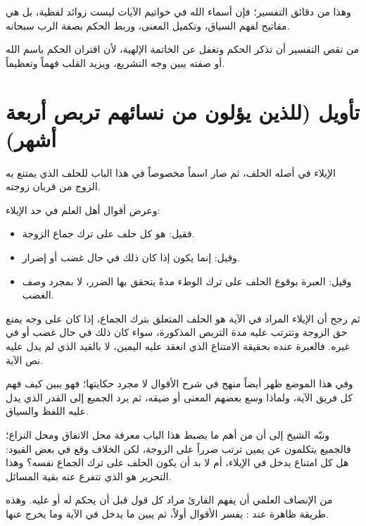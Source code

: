 وهذا من دقائق التفسير؛ فإن أسماء الله في خواتيم الآيات ليست زوائد لفظية، بل هي مفاتيح لفهم السياق، وتكميل المعنى، وربط الحكم بصفة الرب سبحانه.

\begin{fawaid}
من نقص التفسير أن تذكر الحكم وتغفل عن الخاتمة الإلهية، لأن اقتران الحكم باسم الله أو صفته يبين وجه التشريع، ويزيد القلب فهماً وتعظيماً.
\end{fawaid}

\separator

\section{تأويل (للذين يؤلون من نسائهم تربص أربعة أشهر)}
 الإيلاء في أصله الحلف، ثم صار اسماً مخصوصاً في هذا الباب للحلف الذي يمتنع به الزوج من قربان زوجته.

وعرض  أقوال أهل العلم في حد الإيلاء:
\begin{itemize}
    \item فقيل: هو كل حلف على ترك جماع الزوجة.
    \item وقيل: إنما يكون إذا كان ذلك في حال غضب أو إضرار.
    \item وقيل: العبرة بوقوع الحلف على ترك الوطء مدةً يتحقق بها الضرر، لا بمجرد وصف الغضب.
\end{itemize}

ثم رجح أن الإيلاء المراد في الآية هو الحلف المتعلق بترك الجماع، إذا كان على وجه يمنع حق الزوجة وتترتب عليه مدة التربص المذكورة، سواء كان ذلك في حال غضب أو في غيره. فالعبرة عنده بحقيقة الامتناع الذي انعقد عليه اليمين، لا بالقيد الذي لم يدل عليه نص الآية.

وفي هذا الموضع ظهر أيضاً منهج  في شرح الأقوال لا مجرد حكايتها؛ فهو يبين كيف فهم كل فريق الآية، ولماذا وسع بعضهم المعنى أو ضيقه، ثم يرد الجميع إلى القدر الذي يدل عليه اللفظ والسياق.

ونبّه الشيخ إلى أن من أهم ما يضبط هذا الباب معرفة محل الاتفاق ومحل النزاع؛ فالجميع يتكلمون عن يمين ترتب ضرراً على الزوجة، لكن الخلاف وقع في بعض القيود: هل كل امتناع يدخل في الإيلاء، أم لا بد أن يكون الحلف على ترك الجماع نفسه؟ وهذا التحرير هو الذي تتفرع عنه بقية المسائل.

\begin{fawaid}
من الإنصاف العلمي أن يفهم القارئ مراد كل قول قبل أن يحكم له أو عليه. وهذه طريقة ظاهرة عند : يفسر الأقوال أولاً، ثم يبين ما يدخل في الآية وما يخرج عنها.
\end{fawaid}

